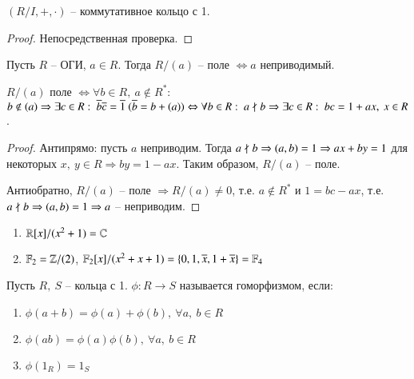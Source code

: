 \documentclass[main]{subfiles}
\begin{document}
\begin{proposition}
    $(R/I, +, \cdot)$ -- коммутативное кольцо с 1.
\end{proposition}

\begin{proof}
    Непосредственная проверка.
\end{proof}

\begin{theorem}
    Пусть $R$ -- ОГИ, $a \in R$. Тогда $R/(a)$ -- поле 
    $\Leftrightarrow a$ неприводимый.
\end{theorem}

\begin{remark}
    $R/(a)$ поле $\Leftrightarrow \forall b \in R, \ a \not\in R^*$: $b \not\in (a) \Rightarrow
    \exists c \in R: \ \overline{b}\overline{c} = \overline{1} \ (\overline{b} = b + (a)) \Leftrightarrow
    \forall b \in R: \ a \not\mid b \Rightarrow \exists c \in R: \ bc = 1 + ax, \ x \in R$. 
\end{remark}

\begin{proof}
    Антипрямо: пусть $a$ неприводим. Тогда 
    $a \not\mid b \Rightarrow (a, b) = 1 \Rightarrow ax + by = 1$ для некоторых $x, \ y \in R \Rightarrow by = 1 - ax$.
    Таким образом, $R/(a)$ -- поле. 

    Антиобратно,  $R/(a)$ -- поле $\Rightarrow R/(a) \neq 0$, т.е. $a \not\in R^*$ и $1 = bc - ax$, т.е. 
    $a \not\mid b \Rightarrow (a, b) = 1 \Rightarrow a$ -- неприводим.
\end{proof}

\begin{example}
    \begin{enumerate}
        \item $\mathbb{R}[x]/(x^2+1) = \mathbb{C}$
        \item $\mathbb{F}_2 = \mathbb{Z}/(2)$, $\mathbb{F}_2[x]/(x^2+x+1) = \{0, 1, \overline{x}, 1 + \overline{x}\}  = \mathbb{F}_4$
    \end{enumerate}
\end{example}

\begin{definition} [Гомоморфизм]
    Пусть $R, \ S$ -- кольца с 1. $\phi: R \rightarrow S$ называется гоморфизмом, если: 
    \begin{enumerate}
        \item $\phi(a+b) = \phi(a) + \phi(b), \ \forall a, \ b \in R$
        \item $\phi(ab) = \phi(a)\phi(b), \ \forall a, \ b \in R$
        \item $\phi(1_R) = 1_S$
    \end{enumerate}
\end{definition}
\end{document}
